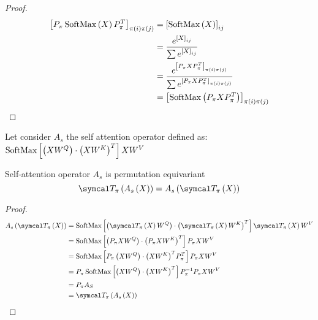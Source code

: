 \begin{proof}
	\begin{align*}
		{\left[P_{\pi}\operatorname{SoftMax}\left(X\right)P_{\pi}^T\right]}_{\pi(i)\pi(j)} & = {\left[\operatorname{SoftMax}\left(X\right)\right]}_{ij}                                                                           \\
		                                                                     & = \frac{e^{{\left[X\right]}_{ij}}}{\sum e^{{\left[X\right]}_{ij}}}                                                     \\
		                                                                     & = \frac{e^{{\left[P_{\pi}XP_{\pi}^T\right]}_{\pi(i)\pi(j)}}}{\sum e^{{\left[P_{\pi}XP_{\pi}^T\right]}_{\pi(i)\pi(j)}}} \\
		                                                                     & = {\left[\operatorname{SoftMax}\left(P_{\pi}XP_{\pi}^T\right)\right]}_{\pi(i)\pi(j)}
	\end{align*}
\end{proof}

Let consider \(A_s\) the self attention operator defined as: \(\operatorname{SoftMax}\left[\left(XW^Q\right)\cdot{\left(XW^K\right)}^T \right]XW^V\)

\begin{theorem}
	Self-attention operator \(A_s\) is permutation equivariant
	\[\Tperm\left(A_s\left(X\right)\right) = A_s\left(\Tperm\left(X\right)\right)\]
\end{theorem}

\begin{proof}
	\begin{align*}
		A_s\left(\Tperm\left(X\right)\right) & = \softmax\left[ \left( \Tperm\left(X\right)W^Q\right) \cdot {\left(\Tperm\left(X\right)W^K\right)}^T \right] \Tperm\left(X\right)W^V \\
		                                     & = \softmax\left[ \left(P_{\pi}XW^Q\right)\cdot{\left(P_{\pi}XW^K\right)}^T  \right]P_{\pi}XW^V                                        \\
		                                     & = \softmax\left[ P_{\pi}\left(XW^Q\right)\cdot{\left(XW^K\right)}^T P_{\pi}^T  \right]P_{\pi}XW^V                                     \\
		                                     & = P_{\pi}\softmax\left[ \left(XW^Q\right)\cdot{\left(XW^K\right)}^T\right]P_{\pi}^{-1}P_{\pi}XW^V                                     \\
		                                     & = P_{\pi}A_S                                                                                                                          \\
		                                     & = \Tperm\left(A_s\left(X\right)\right)
	\end{align*}
\end{proof}
